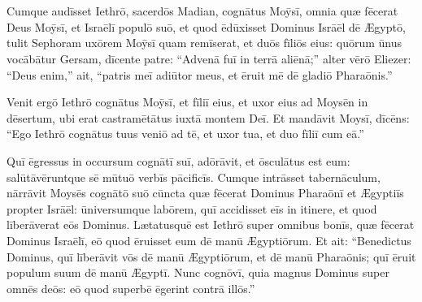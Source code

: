\chapter{}


\thispagestyle{empty}


Cumque audīsset Iethrō, sacerdōs Madian, cognātus Moȳsī,
omnia quæ fēcerat Deus Moȳsī, et Israēlī populō suō, et
quod ēdūxisset Dominus Isrāēl dē Ægyptō, 
tulit Sephoram
uxōrem Moȳsī quam remīserat, 
et duōs fīliōs eius: quōrum ūnus vocābātur
Gersam, dīcente patre: ``Advenā fuī in terrā aliēnā;'' 
alter vērō Eliezer:
``Deus enim,'' ait, ``patris meī adiūtor
meus, et ēruit mē dē gladiō Pharaōnis.'' 

Venit ergō Iethrō
cognātus Moȳsī, et fīliī eius, et uxor eius ad Moysēn in
dēsertum, ubi erat castramētātus iuxtā
montem Deī. 
Et mandāvit Moysī, dīcēns: ``Ego Iethrō cognātus tuus veniō
ad tē, et uxor tua, et duo fīliī cum eā.'' 

Quī ēgressus in occursum
cognātī suī, adōrāvit, et ōsculātus est eum:
salūtāvēruntque sē mūtuō verbīs pācificīs. Cumque intrāsset
tabernāculum, 
nārrāvit Moysēs
cognātō suō cūncta quæ fēcerat Dominus
Pharaōnī et Ægyptiīs propter Isrāēl: ūniversumque labōrem,
quī accidisset eīs in itinere, et quod līberāverat eōs Dominus.
Lætatusquē est Iethrō super omnibus bonīs, quæ fēcerat Dominus Israēlī, eō
quod ēruisset eum dē manū Ægyptiōrum. 
Et ait: ``Benedictus Dominus, quī līberāvit vōs dē manū Ægyptiōrum, et dē manū
Pharaōnis; quī ēruit populum suum dē manū Ægyptī. 
Nunc cognōvī, quia
magnus Dominus super omnēs deōs: eō quod superbē ēgerint contrā illōs.''

